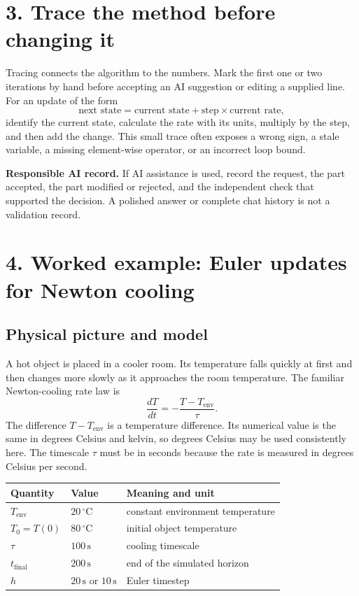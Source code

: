 \documentclass[11pt,a4paper]{article}
\newcommand{\units}[1]{\,\mathrm{#1}}
\begin{document}
\begin{samepage}
\section*{3. Trace the method before changing it}
Tracing connects the algorithm to the numbers. Mark the first one or two iterations by hand before accepting an AI suggestion or editing a supplied line. For an update of the form
\[
\text{next state}=\text{current state}+\text{step}\times\text{current rate},
\]
identify the current state, calculate the rate with its units, multiply by the step, and then add the change. This small trace often exposes a wrong sign, a stale variable, a missing element-wise operator, or an incorrect loop bound.

\begin{aibox}\textbf{Responsible AI record.} If AI assistance is used, record the request, the part accepted, the part modified or rejected, and the independent check that supported the decision. A polished answer or complete chat history is not a validation record.\end{aibox}

\section*{4. Worked example: Euler updates for Newton cooling}
\subsection*{Physical picture and model}
A hot object is placed in a cooler room. Its temperature falls quickly at first and then changes more slowly as it approaches the room temperature. The familiar Newton-cooling rate law is
\[
\frac{dT}{dt}=-\frac{T-T_{\mathrm{env}}}{\tau}.
\]
The difference $T-T_{\mathrm{env}}$ is a temperature difference. Its numerical value is the same in degrees Celsius and kelvin, so degrees Celsius may be used consistently here. The timescale $\tau$ must be in seconds because the rate is measured in degrees Celsius per second.

\begin{center}\small
\begin{tabular}{>{\raggedright\arraybackslash}p{.22\linewidth}>{\raggedright\arraybackslash}p{.25\linewidth}>{\raggedright\arraybackslash}p{.40\linewidth}}
\toprule
\textbf{Quantity} & \textbf{Value} & \textbf{Meaning and unit} \\
\midrule
$T_{\mathrm{env}}$ & $20\units{^\circ C}$ & constant environment temperature \\
$T_0=T(0)$ & $80\units{^\circ C}$ & initial object temperature \\
$\tau$ & $100\units{s}$ & cooling timescale \\
$t_{\mathrm{final}}$ & $200\units{s}$ & end of the simulated horizon \\
$h$ & $20\units{s}$ or $10\units{s}$ & Euler timestep \\
\bottomrule
\end{tabular}
\end{center}


\end{samepage}
\end{document}
